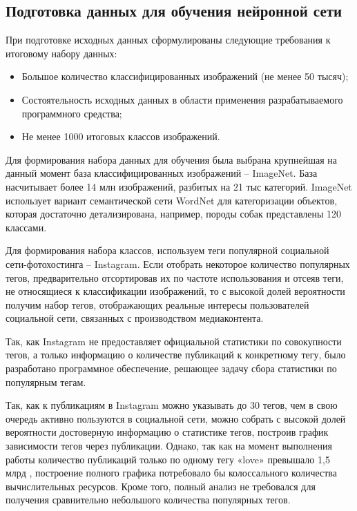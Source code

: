 \subsection{Подготовка данных для обучения нейронной сети}
При подготовке исходных данных сформулированы следующие требования к итоговому набору данных:
\begin{itemize}
  \item Большое количество классифицированных изображений (не менее 50 тысяч);
  \item Состоятельность исходных данных в области применения разрабатываемого программного средства;
  \item Не менее 1000 итоговых классов изображений.
\end{itemize}

Для формирования набора данных для обучения была выбрана крупнейшая на данный момент база классифицированных изображений – ImageNet. 
База насчитывает более 14 млн изображений, разбитых на 21 тыс категорий. 
ImageNet использует вариант семантической сети WordNet для категоризации объектов, которая достаточно детализирована, например, породы собак представлены 120 классами.

Для формирования набора классов, используем теги популярной социальной сети-фотохостинга – Instagram. 
Если отобрать некоторое количество популярных тегов, предварительно отсортировав их по частоте использования и отсеяв теги, не относящиеся к классификации изображений, то с высокой долей вероятности получим набор тегов, отображающих реальные интересы пользователей социальной сети, связанных с производством медиаконтента.

Так, как Instagram не предоставляет официальной статистики по совокупности тегов, а только информацию о количестве публикаций к конкретному тегу, было разработано программное обеспечение, решающее задачу сбора статистики по популярным тегам.

Так, как к публикациям в Instagram можно указывать до 30 тегов, чем в свою очередь активно пользуются в социальной сети, можно собрать с высокой долей вероятности достоверную информацию о статистике тегов, построив график зависимости тегов через публикации. 
Однако, так как на момент выполнения работы количество публикаций только по одному тегу «love» превышало 1,5 млрд \cite{love}, построение полного графика потребовало бы колоссального количества вычислительных ресурсов. Кроме того, полный анализ не требовался для получения сравнительно небольшого количества популярных тегов.


